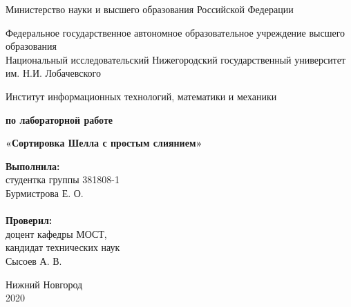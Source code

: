 \documentclass[12pt, letterpaper]{report}
\begin{document}
	
	\begin{titlepage}
		
		\begin{center}
			Министерство науки и высшего образования Российской Федерации
		\end{center}
		
		\begin{center}
			Федеральное государственное автономное образовательное учреждение высшего образования \\
			Национальный исследовательский Нижегородский государственный университет им. Н.И. Лобачевского
		\end{center}
		
		\begin{center}
			Институт информационных технологий, математики и механики
		\end{center}
		
		\vspace{4em}
		
		\begin{center}
			\textbf{ по лабораторной работе} \\
		\end{center}
		\begin{center}
			\textbf{\Large«Сортировка Шелла с простым слиянием»} \\
		\end{center}
		
		\vspace{4em}
		
		\newbox{\lbox}
		\newlength{\maxl}
		\setlength{\maxl}{\wd\lbox}
		\hfill\parbox{7cm}{
			\hspace*{5cm}\hspace*{-5cm}\textbf{Выполнила:} \\ студентка группы 381808-1 \\ Бурмистрова Е. О.\\
			\\
			\hspace*{5cm}\hspace*{-5cm}\textbf{Проверил:}\\ доцент кафедры МОСТ, \\ кандидат технических наук \\ Сысоев А. В.\\}
		\vspace{\fill}
		
		\begin{center} Нижний Новгород \\ 2020 \end{center}
		
	\end{titlepage}
	
\end{document}
